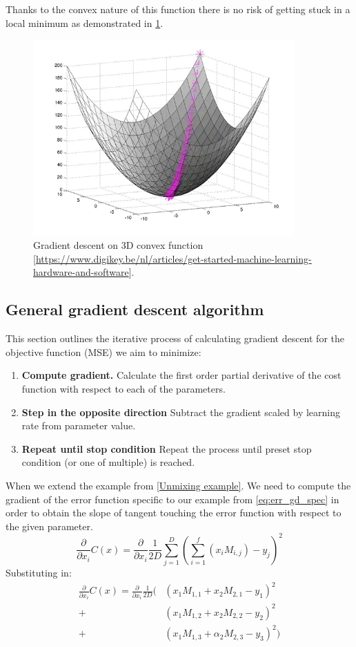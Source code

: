 Thanks to the convex nature of this function there is no risk of getting stuck in a local minimum as demonstrated in \cref{fig:gdp}.

\begin{figure}
  \includegraphics[width=100mm]{img/gdpic.png}
  \caption[]%
  {Gradient descent on 3D convex function [\url{https://www.digikey.be/nl/articles/get-started-machine-learning-hardware-and-software}].}
  \label{fig:gdp}
\end{figure}

\subsection{General gradient descent algorithm}
This section outlines the iterative process of calculating gradient descent for the objective function (MSE) we aim to minimize:

\begin{enumerate}
  \item \textbf{Compute gradient.}
  Calculate the first order partial derivative of the cost function with respect to each of the parameters.
  \item \textbf{Step in the opposite direction} 
  Subtract the gradient scaled by learning rate from parameter value.
  \item \textbf{Repeat until stop condition} Repeat the process until preset stop condition (or one of multiple) is reached.
\end{enumerate}

When we extend the example from \cref{Unmixing example}.
   We need to compute the gradient of the error function specific to our example from \cref{eq:err_gd_spec} in order to obtain the slope of tangent touching the error function with respect to the given parameter.
  \begin{equation}
  \frac{\partial}{\partial x_i} C(x)=\frac{\partial}{\partial x_i}\frac{1}{2D}\sum_{j=1}^{D}(\sum_{i=1}^{f}(x_iM_{i,j})-y_j)^2 
  \label{eq:err_gd_spec}
  \end{equation}
Substituting in:
  \[\begin{aligned}
  \frac{\partial}{\partial x_i} C(x)=\frac{\partial}{\partial x_i}\frac{1}{2D}(&(x_1 M_{1,1}+x_2 M_{2,1}-y_1)^2\\
  +&(x_1 M_{1,2}+x_2 M_{2,2}-y_2)^2\\
  +&(x_1 M_{1,3}+\alpha_2 M_{2,3}-y_3)^2)
 \end{aligned}\]

